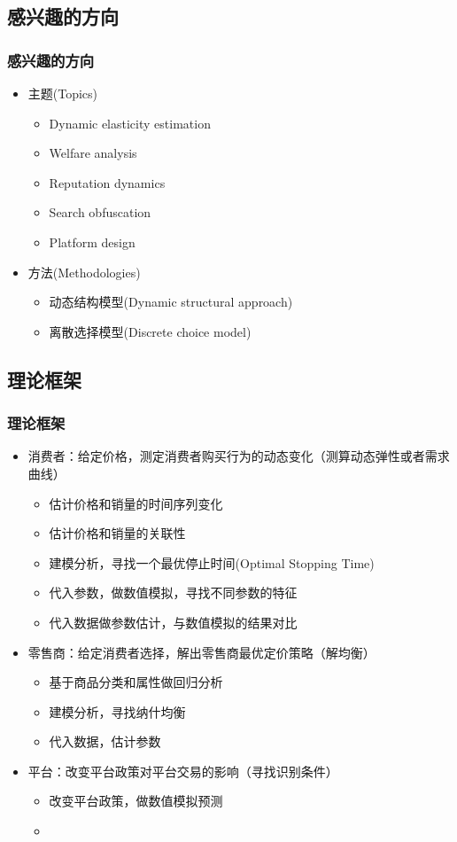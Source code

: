 \documentclass{beamer}
\begin{document}
\subsection{感兴趣的方向}
\begin{frame}
\frametitle{感兴趣的方向}
\begin{itemize}
\item 主题(Topics)
\begin{itemize}
  \item Dynamic elasticity estimation 
  \item Welfare analysis
  \item Reputation dynamics
  \item Search obfuscation
  \item Platform design
\end{itemize}
\item 方法(Methodologies)
\begin{itemize}
  \item 动态结构模型(Dynamic structural approach)
  \item 离散选择模型(Discrete choice model)
\end{itemize}
\end{itemize}
\end{frame}

\subsection{理论框架}
\begin{frame}[allowframebreaks]
\frametitle{理论框架}
\begin{itemize}
  \item 消费者：给定价格，测定消费者购买行为的动态变化（测算动态弹性或者需求曲线）
  \begin{itemize}
    \item 估计价格和销量的时间序列变化
    \item 估计价格和销量的关联性
    \item 建模分析，寻找一个最优停止时间(Optimal Stopping Time)
    \item 代入参数，做数值模拟，寻找不同参数的特征
    \item 代入数据做参数估计，与数值模拟的结果对比
  \end{itemize}
  \framebreak
  \item 零售商：给定消费者选择，解出零售商最优定价策略（解均衡）
  \begin{itemize}
    \item 基于商品分类和属性做回归分析
    \item 建模分析，寻找纳什均衡
    \item 代入数据，估计参数
  \end{itemize}
  \item 平台：改变平台政策对平台交易的影响（寻找识别条件）
  \begin{itemize}
    \item 改变平台政策，做数值模拟预测
  \end{itemize}
  \begin{itemize}
    \item 
  \end{itemize}
\end{itemize}
\end{frame}
\end{document}
